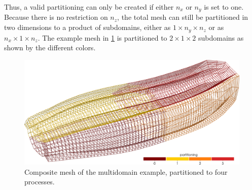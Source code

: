 Thus, a valid partitioning can only be created if either $n_x$ or $n_y$ is set to one. Because there is no restriction on $n_z$, the total mesh can still be partitioned in two dimensions to a product of subdomains, either as $1 \times n_y \times n_z$ or as $n_x \times 1 \times n_z$.
The example mesh in \cref{fig:multidomain_matrix_mesh} is partitioned to $2 \times 1 \times 2$ subdomains as shown by the different colors.

% 
\begin{figure}
  \centering%
  \includegraphics[width=\textwidth]{images/implementation/multidomain_matrix_mesh.png}%
  \caption{Composite mesh of the multidomain example, partitioned to four processes.}%
  \label{fig:multidomain_matrix_mesh}%
\end{figure}%

